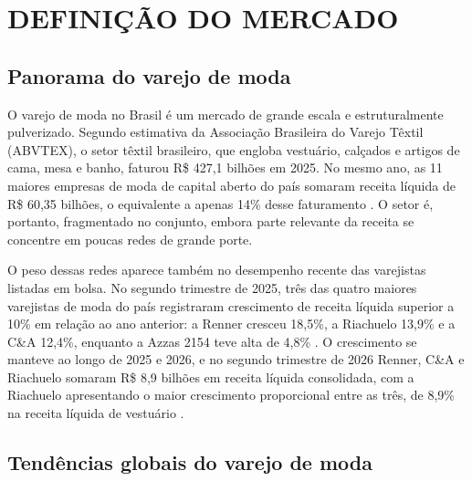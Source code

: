 %

\section{DEFINIÇÃO DO MERCADO}
\label{sec:mercado}
\nocite{startse2023autoatendimento} %

\subsection{Panorama do varejo de moda}
\label{subsec:panorama}

O varejo de moda no Brasil é um mercado de grande escala e estruturalmente pulverizado. Segundo estimativa da Associação Brasileira do Varejo Têxtil (ABVTEX), o setor têxtil brasileiro, que engloba vestuário, calçados e artigos de cama, mesa e banho, faturou R\$ 427,1 bilhões em 2025. No mesmo ano, as 11 maiores empresas de moda de capital aberto do país somaram receita líquida de R\$ 60,35 bilhões, o equivalente a apenas 14\% desse faturamento \cite{gbljeans2026maiores}. O setor é, portanto, fragmentado no conjunto, embora parte relevante da receita se concentre em poucas redes de grande porte.

O peso dessas redes aparece também no desempenho recente das varejistas listadas em bolsa. No segundo trimestre de 2025, três das quatro maiores varejistas de moda do país registraram crescimento de receita líquida superior a 10\% em relação ao ano anterior: a Renner cresceu 18,5\%, a Riachuelo 13,9\% e a C\&A 12,4\%, enquanto a Azzas 2154 teve alta de 4,8\% \cite{timesbrasil2025varejistas}. O crescimento se manteve ao longo de 2025 e 2026, e no segundo trimestre de 2026 Renner, C\&A e Riachuelo somaram R\$ 8,9 bilhões em receita líquida consolidada, com a Riachuelo apresentando o maior crescimento proporcional entre as três, de 8,9\% na receita líquida de vestuário \cite{gbljeans2026trimestre}.

\subsection{Tendências globais do varejo de moda}
\label{subsec:tendencias}

